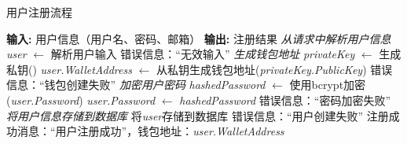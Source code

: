 \documentclass{article}
\begin{document}
\begin{algorithm}
\caption{用户注册流程}
\begin{algorithmic}[1]  %
\State \textbf{输入:} 用户信息（用户名、密码、邮箱）
\State \textbf{输出:} 注册结果
\State
\State \textit{从请求中解析用户信息}
\State \textit{user} $\gets$ 解析用户输入
\State
{}
    \State \Return 错误信息：“无效输入”
\EndIf
\State
\State \textit{生成钱包地址}
\Try
    \State \textit{privateKey} $\gets$ 生成私钥()
    \State \textit{user.WalletAddress} $\gets$ 从私钥生成钱包地址(\textit{privateKey.PublicKey})
    \State \Return 错误信息：“钱包创建失败”
\EndTry
\State
\State \textit{加密用户密码}
\Try
    \State \textit{hashedPassword} $\gets$ 使用bcrypt加密(\textit{user.Password})
    \State \textit{user.Password} $\gets$ \textit{hashedPassword}
    \State \Return 错误信息：“密码加密失败”
\EndTry
\State
\State \textit{将用户信息存储到数据库}
\Try
    \State 将\textit{user}存储到数据库
    \State \Return 错误信息：“用户创建失败”
\EndTry
\State
\State \Return 注册成功消息：“用户注册成功”，钱包地址：\textit{user.WalletAddress}
\end{algorithmic}
\end{algorithm}
\end{document}
